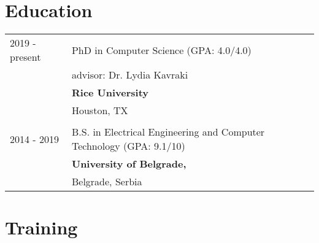 \documentclass[a4paper,12pt]{article}
\begin{document}


\section{Education}
\begin{tabularx}{\linewidth}{@{}l X@{}}	

2019 - present & PhD in Computer Science \hfill (GPA: 4.0/4.0) \\ 
& advisor: Dr. Lydia Kavraki \\
& \textbf{Rice University} \\
& Houston, TX \\
\\
2014 - 2019 & B.S. in Electrical Engineering and Computer Technology \hfill  (GPA: 9.1/10) \\
& \textbf{University of Belgrade,} \\
& Belgrade, Serbia \\
\end{tabularx}



\section{Training}
\end{document}
